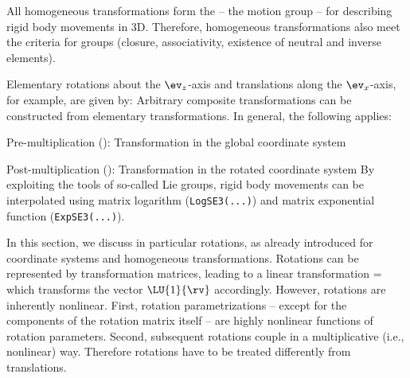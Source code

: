 All homogeneous transformations form the  -- the motion group -- for describing rigid body movements in 3D. Therefore, homogeneous transformations also meet the criteria for groups (closure, associativity, existence of neutral and inverse elements).

Elementary rotations about the $\ev_z$-axis and translations along the $\ev_x$-axis, for example, are given by:
Arbitrary composite transformations can be constructed from elementary transformations. In general, the following applies:
\bi
  \item Pre-multiplication (): Transformation in the global coordinate system
  \item Post-multiplication (): Transformation in the rotated coordinate system
\ei
By exploiting the tools of so-called Lie groups, rigid body movements can be interpolated using matrix logarithm (\texttt{LogSE3(...)}) and matrix exponential function (\texttt{ExpSE3(...)}).




In this section, we discuss in particular rotations, as already introduced for coordinate systems and homogeneous transformations.
Rotations can be represented by transformation matrices, leading to a linear transformation
\be
    =  
\ee
which transforms the vector $\LU{1}{\rv}$ accordingly.
However, rotations are inherently nonlinear. First, rotation parametrizations -- except for the components of the rotation matrix itself -- are highly nonlinear functions of rotation parameters.
Second, subsequent rotations couple in a multiplicative (i.e., nonlinear) way. Therefore rotations have to be treated differently from translations.


